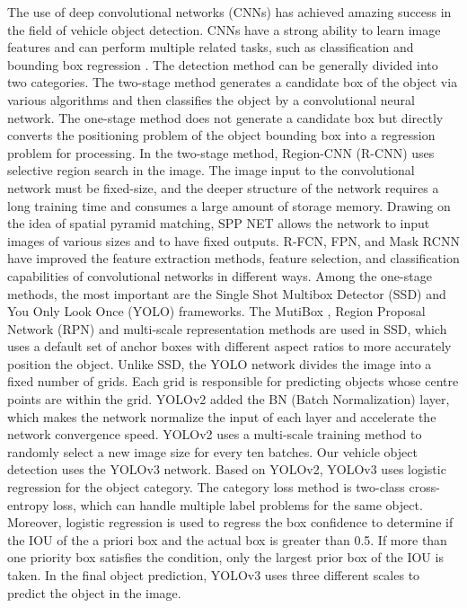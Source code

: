 \begin{sloppypar}
  The use of deep convolutional networks (CNNs) has achieved amazing success in the field of vehicle object detection. CNNs have a strong ability to learn image features and can perform multiple related tasks, such as classification and bounding box regression \cite{zhao2019object}. The detection method can be generally divided into two categories. The two-stage method generates a candidate box of the object via various algorithms and then classifies the object by a convolutional neural network. The one-stage method does not generate a candidate box but directly converts the positioning problem of the object bounding box into a regression problem for processing. In the two-stage method, Region-CNN (R-CNN) \cite{6909475} uses selective region search \cite{uijlings2013selective} in the image. The image input to the convolutional network must be fixed-size, and the deeper structure of the network requires a long training time and consumes a large amount of storage memory. Drawing on the idea of spatial pyramid matching, SPP NET \cite{kaiming2014jian}  allows the network to input images of various sizes and to have fixed outputs. R-FCN, FPN, and Mask RCNN have improved the feature extraction methods, feature selection, and classification capabilities of convolutional networks in different ways. Among the one-stage methods, the most important are the Single Shot Multibox Detector (SSD) \cite{liu2016ssd} and You Only Look Once (YOLO) \cite{7780460} frameworks. The MutiBox \cite{6909673}, Region Proposal Network (RPN) and multi-scale representation methods are used in SSD, which uses a default set of anchor boxes with different aspect ratios to more accurately position the object. Unlike SSD, the YOLO \cite{7780460} network divides the image into a fixed number of grids. Each grid is responsible for predicting objects whose centre points are within the grid. YOLOv2 \cite{8100173} added the BN (Batch Normalization) layer, which makes the network normalize the input of each layer and accelerate the network convergence speed. YOLOv2 uses a multi-scale training method to randomly select a new image size for every ten batches. Our vehicle object detection uses the YOLOv3 \cite{redmon2018yolov3} network. Based on YOLOv2, YOLOv3 uses logistic regression for the object category. The category loss method is two-class cross-entropy loss, which can handle multiple label problems for the same object. Moreover, logistic regression is used to regress the box confidence to determine if the IOU of the a priori box and the actual box is greater than 0.5. If more than one priority box satisfies the condition, only the largest prior box of the IOU is taken. In the final object prediction, YOLOv3 uses three different scales to predict the object in the image.


\end{sloppypar}

